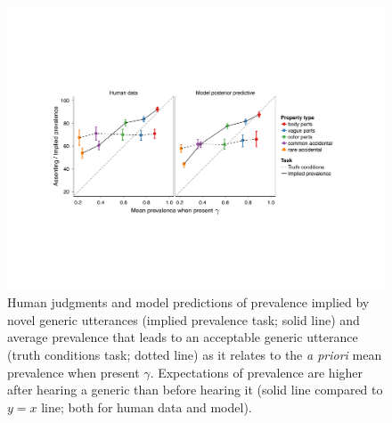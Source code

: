 \documentclass{pnastwo}
\begin{document}
\begin{article}
\begin{figure}
\centering
    \includegraphics[width=1.45\columnwidth]{asym-lines-data-model-2phi-2so-50kx3.pdf}
    \caption{Human judgments and model predictions of prevalence implied by novel generic utterances (implied prevalence task; solid line) and average prevalence that leads to an acceptable generic utterance (truth conditions task; dotted line) as it relates to the \emph{a priori} mean prevalence when present $\gamma$.
    Expectations of prevalence are higher after hearing a generic than before hearing it (solid line compared to $y=x$ line; both for human data and model).
}
\end{figure}
\end{article}
\end{document}
